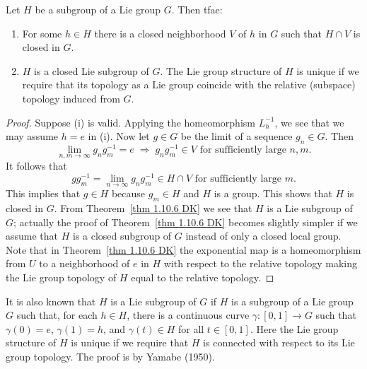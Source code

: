 \begin{cor}\label{cor 1.10.7 DK}
    Let $H$ be a subgroup of a Lie group $G$. Then \gls{tfae}:
    \begin{enumerate}[label=(\roman*)]
        \item For some $h\in H$ there is a closed neighborhood $V$ of $h$ in $G$ such that $H\cap V$ is closed in $G$.
        \item $H$ is a closed Lie subgroup of $G$. The Lie group structure of $H$ is unique if we require that its topology as a Lie group coincide with the relative (subspace) topology induced from $G$.
    \end{enumerate}
\end{cor}
\begin{proof}
    Suppose (i) is valid. Applying the homeomorphism $L_h^{-1}$, we see that we may assume $h=e$ in (i). Now let $g\in G$ be the limit of a sequence $g_n\in G$. Then
    \[\lim_{n,m\to\infty} g_ng_m^{-1}=e\;\Rightarrow\; g_ng_m^{-1}\in V\text{ for sufficiently large }n,m.\]
    It follows that
    \[gg_m^{-1}=\lim_{n\to\infty} g_ng_m^{-1}\in H\cap V\text{ for sufficiently large }m.\]
    This implies that $g\in H$ because $g_m\in H$ and $H$ is a group. This shows that $H$ is closed in $G$. From Theorem~\ref{thm 1.10.6 DK} we see that $H$ is a Lie subgroup of $G$; actually the proof of Theorem~\ref{thm 1.10.6 DK} becomes slightly simpler if we assume that $H$ is a closed subgroup of $G$ instead of only a closed local group. Note that in Theorem~\ref{thm 1.10.6 DK} the exponential map is a homeomorphism from $U$ to a neighborhood of $e$ in $H$ with respect to the relative topology making the Lie group topology of $H$ equal to the relative topology.
\end{proof}

\begin{rem}
    It is also known that $H$ is a Lie subgroup of $G$ if $H$ is a subgroup of a Lie group $G$ such that, for each $h\in H$, there is a continuous curve $\gamma:[0,1]\to G$ such that $\gamma(0)=e$, $\gamma(1)=h$, and $\gamma(t)\in H$ for all $t\in [0,1]$. Here the Lie group structure of $H$ is unique if we require that $H$ is connected with respect to its Lie group topology. The proof is by Yamabe (1950).

\end{rem}




